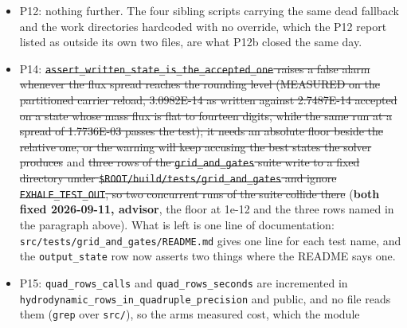 \documentclass[english,a4paper]{my_memo}
\begin{document}
\begin{itemize}
{  default off and a rounding control experiment nothing is adopted from.}
  (\textbf{fixed 2026-09-11, P15}, which was also the Codex review\textquotesingle s second
  finding: the arm stores its own face departures, and the continuation
  combination is refused rather than weighted, because the two schemes
  reconstruct different faces and no single pair of departures satisfies the
  blended row identity. The momentum terms are still not handed back by the
  arm, and they are not read from a previous evaluation either: the one
  expression of each is evaluated at the call site for the state just
  assembled, which is the P4 entry above.) The
  marching stop of \texttt{mol\_carrier} reports a momentum measure of 1.979E+00
  against a scale that is now the largest physical term in the layer, which
  is commensurable with the mass and energy entries in a way it was not;
  whether the marching stop should quote it at all is an acceptance
  question.
\item
  P12: nothing further. The four sibling scripts carrying the same dead
  fallback and the work directories hardcoded with no override, which the
  P12 report listed as outside its own two files, are what P12b closed the
  same day.
\item
  P14: \st{\mbox{\texttt{assert\_written\_state\_is\_the\_accepted\_one}} raises a false alarm
  whenever the flux spread reaches the rounding level (MEASURED on the
  partitioned carrier reload, 3.0982E-14 as written against 2.7487E-14
  accepted on a state whose mass flux is flat to fourteen digits, while the
  same run at a spread of 1.7736E-03 passes the test); it needs an absolute
  floor beside the relative one, or the warning will keep accusing the best
  states the solver produces} and \st{three rows of the \mbox{\texttt{grid\_and\_gates}} suite
  write to a fixed directory under \mbox{\texttt{\$ROOT/build/tests/grid\_and\_gates}} and
  ignore \mbox{\texttt{EXHALE\_TEST\_OUT}}, so two concurrent runs of the suite collide
  there} (\textbf{both fixed 2026-09-11, advisor}, the floor at 1e-12 and the
  three rows named in the paragraph above). What is left is one line of
  documentation: \texttt{src/tests/grid\_and\_gates/README.md} gives one line for each
  test name, and the \texttt{output\_state} row now asserts two things where the
  README says one.
\item
  P15: \texttt{quad\_rows\_calls} and \texttt{quad\_rows\_seconds} are incremented in
  \texttt{hydrodynamic\_rows\_in\_quadruple\_precision} and public, and no file reads
  them (\texttt{grep} over \texttt{src/}), so the arm\textquotesingle s measured cost, which the module

\end{itemize}
\end{document}
